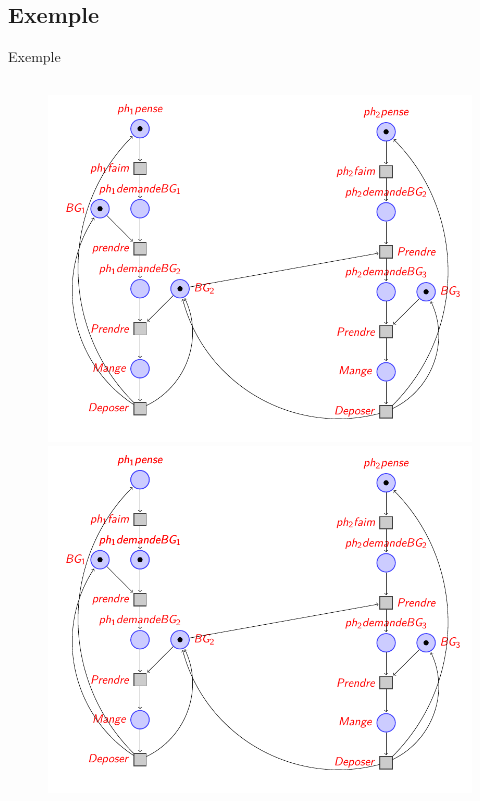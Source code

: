 
\subsection{Exemple}
\begin{frame}{Exemple}
	\begin{columns}
		
		\begin{column}{0.4\textwidth}
			\begin{figure}
				\centering
				{ 
					\includegraphics[width=\linewidth]{resources/testpetri1}
				}
				\only<2-2>
				{
					\includegraphics[width=\linewidth]{resources/testpetri2}
}
\end{figure}
\end{column}
\end{columns}
\end{frame}

